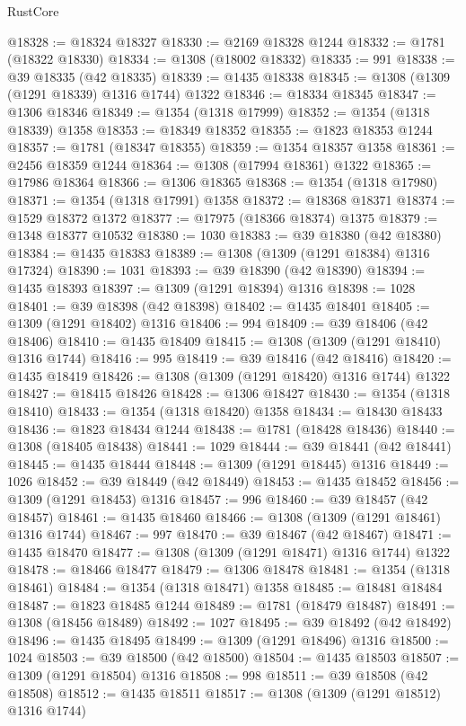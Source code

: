 \begin{lexlean}{RustCore}
\begin{coremodule}
@18328 := @18324 @18327
@18330 := @2169 @18328 @1244
@18332 := @1781 (@18322 @18330)
@18334 := @1308 (@18002 @18332)
@18335 := 991
@18338 := @39 @18335 (@42 @18335)
@18339 := @1435 @18338
@18345 := @1308 (@1309 (@1291 @18339) @1316 @1744) @1322
@18346 := @18334 @18345
@18347 := @1306 @18346
@18349 := @1354 (@1318 @17999)
@18352 := @1354 (@1318 @18339) @1358
@18353 := @18349 @18352
@18355 := @1823 @18353 @1244
@18357 := @1781 (@18347 @18355)
@18359 := @1354 @18357 @1358
@18361 := @2456 @18359 @1244
@18364 := @1308 (@17994 @18361) @1322
@18365 := @17986 @18364
@18366 := @1306 @18365
@18368 := @1354 (@1318 @17980)
@18371 := @1354 (@1318 @17991) @1358
@18372 := @18368 @18371
@18374 := @1529 @18372 @1372
@18377 := @17975 (@18366 @18374) @1375
@18379 := @1348 @18377 @10532
@18380 := 1030
@18383 := @39 @18380 (@42 @18380)
@18384 := @1435 @18383
@18389 := @1308 (@1309 (@1291 @18384) @1316 @17324)
@18390 := 1031
@18393 := @39 @18390 (@42 @18390)
@18394 := @1435 @18393
@18397 := @1309 (@1291 @18394) @1316
@18398 := 1028
@18401 := @39 @18398 (@42 @18398)
@18402 := @1435 @18401
@18405 := @1309 (@1291 @18402) @1316
@18406 := 994
@18409 := @39 @18406 (@42 @18406)
@18410 := @1435 @18409
@18415 := @1308 (@1309 (@1291 @18410) @1316 @1744)
@18416 := 995
@18419 := @39 @18416 (@42 @18416)
@18420 := @1435 @18419
@18426 := @1308 (@1309 (@1291 @18420) @1316 @1744) @1322
@18427 := @18415 @18426
@18428 := @1306 @18427
@18430 := @1354 (@1318 @18410)
@18433 := @1354 (@1318 @18420) @1358
@18434 := @18430 @18433
@18436 := @1823 @18434 @1244
@18438 := @1781 (@18428 @18436)
@18440 := @1308 (@18405 @18438)
@18441 := 1029
@18444 := @39 @18441 (@42 @18441)
@18445 := @1435 @18444
@18448 := @1309 (@1291 @18445) @1316
@18449 := 1026
@18452 := @39 @18449 (@42 @18449)
@18453 := @1435 @18452
@18456 := @1309 (@1291 @18453) @1316
@18457 := 996
@18460 := @39 @18457 (@42 @18457)
@18461 := @1435 @18460
@18466 := @1308 (@1309 (@1291 @18461) @1316 @1744)
@18467 := 997
@18470 := @39 @18467 (@42 @18467)
@18471 := @1435 @18470
@18477 := @1308 (@1309 (@1291 @18471) @1316 @1744) @1322
@18478 := @18466 @18477
@18479 := @1306 @18478
@18481 := @1354 (@1318 @18461)
@18484 := @1354 (@1318 @18471) @1358
@18485 := @18481 @18484
@18487 := @1823 @18485 @1244
@18489 := @1781 (@18479 @18487)
@18491 := @1308 (@18456 @18489)
@18492 := 1027
@18495 := @39 @18492 (@42 @18492)
@18496 := @1435 @18495
@18499 := @1309 (@1291 @18496) @1316
@18500 := 1024
@18503 := @39 @18500 (@42 @18500)
@18504 := @1435 @18503
@18507 := @1309 (@1291 @18504) @1316
@18508 := 998
@18511 := @39 @18508 (@42 @18508)
@18512 := @1435 @18511
@18517 := @1308 (@1309 (@1291 @18512) @1316 @1744)

\end{coremodule}
\end{lexlean}
